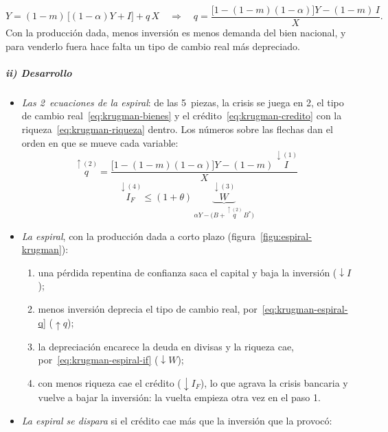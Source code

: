\documentclass[11pt]{article}
\begin{document}
\begin{itemize}
\begin{enumerate}
    \begin{equation}\label{eq:krugman-bienes}
    Y=(1-m)\,\bigl[(1-\alpha)Y+I\bigr]+q\,X\quad\Longrightarrow\quad q=\frac{\bigl[1-(1-m)(1-\alpha)\bigr]Y-(1-m)\,I}{X}.
    \end{equation}
    Con la producción dada, menos inversión es menos demanda del bien nacional, y para venderlo fuera hace falta un tipo de cambio real más depreciado.
  \end{enumerate}
\end{itemize}

\subparagraph{ii) Desarrollo}

\begin{itemize}
\item \emph{Las 2~ecuaciones de la espiral}: de las 5~piezas, la crisis se juega en 2, el tipo de cambio real~\eqref{eq:krugman-bienes} y el crédito~\eqref{eq:krugman-credito} con la riqueza~\eqref{eq:krugman-riqueza} dentro. Los números sobre las flechas dan el orden en que se mueve cada variable:
  \begin{equation}\label{eq:krugman-espiral-q}
  \overset{\uparrow(2)}{q}=\frac{\bigl[1-(1-m)(1-\alpha)\bigr]Y-(1-m)\,\overset{\downarrow(1)}{I}}{X}
  \end{equation}
  \begin{equation}\label{eq:krugman-espiral-if}
  \overset{\downarrow(4)}{I_F}\le(1+\theta)\,\underbrace{\overset{\downarrow(3)}{W}}_{\alpha Y-\bigl(B+\overset{\uparrow(2)}{q}\,B^{*}\bigr)}
  \end{equation}
\item \emph{La espiral}, con la producción dada a corto plazo (figura~\ref{figu:espiral-krugman}):
  \begin{enumerate}
  \item una pérdida repentina de confianza saca el capital y baja la inversión ($\downarrow I$);
  \item menos inversión deprecia el tipo de cambio real, por~\eqref{eq:krugman-espiral-q} ($\uparrow q$);
  \item la depreciación encarece la deuda en divisas y la riqueza cae, por~\eqref{eq:krugman-espiral-if} ($\downarrow W$);
  \item con menos riqueza cae el crédito ($\downarrow I_F$), lo que agrava la crisis bancaria y vuelve a bajar la inversión: la vuelta empieza otra vez en el paso 1.
  \end{enumerate}
\item \emph{La espiral se dispara} si el crédito cae más que la inversión que la provocó:

\end{itemize}
\end{document}
